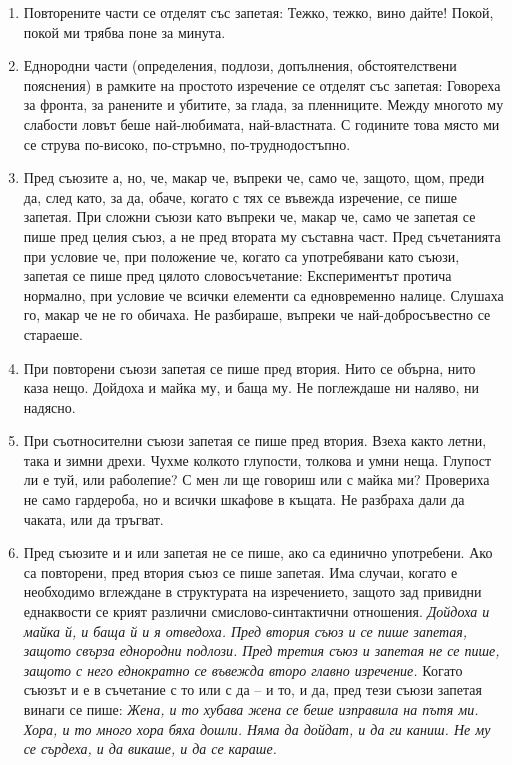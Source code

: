 \begin{enumerate}
    \item Повторените части се отделят със запетая: Тежко, тежко, вино дайте! Покой, покой ми трябва поне за минута.

\item Еднородни части (определения, подлози, допълнения, обстоятелствени пояснения) в рамките на простото изречение се отделят със запетая: Говореха за фронта, за ранените и убитите, за глада, за пленниците. Между многото му слабости ловът беше най-любимата, най-властната. С годините това място ми се струва по-високо, по-стръмно, по-труднодостъпно.

\item Пред съюзите а, но, че, макар че, въпреки че, само че, защото, щом, преди да, след като, за да, обаче, когато с тях се въвежда изречение, се пише запетая. При сложни съюзи като въпреки че, макар че, само че запетая се пише пред целия съюз, а не пред втората му съставна част. Пред съчетанията при условие че, при положение че, когато са употребявани като съюзи, запетая се пише пред цялото словосъчетание: Експериментът протича нормално, при условие че всички елементи са едновременно налице. Слушаха го, макар че не го обичаха. Не разбираше, въпреки че най-добросъвестно се стараеше.

\item При повторени съюзи запетая се пише пред втория. Нито се обърна, нито каза нещо. Дойдоха и майка му, и баща му. Не поглеждаше ни наляво, ни надясно.

\item При съотносителни съюзи запетая се пише пред втория. Взеха както летни, така и зимни дрехи. Чухме колкото глупости, толкова и умни неща. Глупост ли е туй, или раболепие? С мен ли ще говориш или с майка ми? Провериха не само гардероба, но и всички шкафове в къщата. Не разбраха дали да чаката, или да тръгват.

\item Пред съюзите и и или запетая не се пише, ако са единично употребени. Ако са повторени, пред втория съюз се пише запетая. Има случаи, когато е необходимо вглеждане в структурата на изречението, защото зад привидни еднаквости се крият различни смислово-синтактични отношения. \textit{Дойдоха и майка й, и баща й и я отведоха. Пред втория съюз и се пише запетая, защото свърза еднородни подлози. Пред третия съюз и запетая не се пише, защото с него еднократно се въвежда второ главно изречение.}
Когато съюзът и е в съчетание с то или с да – и то, и да, пред тези съюзи запетая винаги се пише: \textit{Жена, и то хубава жена се беше изправила на пътя ми. Хора, и то много хора бяха дошли. Няма да дойдат, и да ги каниш. Не му се сърдеха, и да викаше, и да се караше.}


\end{enumerate}
